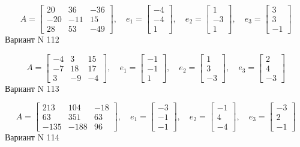 \documentclass[11pt]{report}
\begin{document}
$$A = \left[\begin{matrix}20 & 36 & -36\\-20 & -11 & 15\\28 & 53 & -49\end{matrix}\right],\quad e_1 = \left[\begin{matrix}-4\\-4\\1\end{matrix}\right],\quad e_2 = \left[\begin{matrix}1\\-3\\1\end{matrix}\right],\quad e_3 = \left[\begin{matrix}3\\3\\-1\end{matrix}\right]$$Вариант N 112

$$A = \left[\begin{matrix}-4 & 3 & 15\\-7 & 18 & 17\\3 & -9 & -4\end{matrix}\right],\quad e_1 = \left[\begin{matrix}-1\\-1\\1\end{matrix}\right],\quad e_2 = \left[\begin{matrix}1\\3\\-3\end{matrix}\right],\quad e_3 = \left[\begin{matrix}2\\4\\-3\end{matrix}\right]$$Вариант N 113

$$A = \left[\begin{matrix}213 & 104 & -18\\63 & 351 & 63\\-135 & -188 & 96\end{matrix}\right],\quad e_1 = \left[\begin{matrix}-3\\-1\\-1\end{matrix}\right],\quad e_2 = \left[\begin{matrix}-1\\4\\-4\end{matrix}\right],\quad e_3 = \left[\begin{matrix}-3\\2\\-1\end{matrix}\right]$$Вариант N 114
\end{document}

